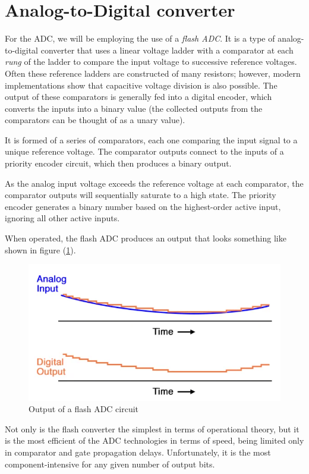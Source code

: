 \documentclass[%
 reprint,
nofootinbib,
 amsmath,amssymb,
 aps,
floatfix,
]{revtex4-2}
\begin{document}
\section{Analog-to-Digital converter}
    For the ADC, we will be employing the use of a \textit{flash ADC}. It is a type of analog-to-digital converter that uses a linear voltage ladder with a comparator at each \textit{rung} of the ladder to compare the input voltage to successive reference voltages. Often these reference ladders are constructed of many resistors; however, modern implementations show that capacitive voltage division is also possible. The output of these comparators is generally fed into a digital encoder, which converts the inputs into a binary value (the collected outputs from the comparators can be thought of as a unary value).
    \par
    It is formed of a series of comparators, each one comparing the input signal to a unique reference voltage. The comparator outputs connect to the inputs of a priority encoder circuit, which then produces a binary output.
    \par
    As the analog input voltage exceeds the reference voltage at each comparator, the comparator outputs will sequentially saturate to a high state. The priority encoder generates a binary number based on the highest-order active input, ignoring all other active inputs.
    \par
    When operated, the flash ADC produces an output that looks something like shown in figure (\ref{fig:flashadc}).
    \begin{figure}
        \centering
        \includegraphics[scale = 0.55]{Figures/flashadc.png}
        \caption{Output of a flash ADC circuit}
        \label{fig:flashadc}
    \end{figure}
    Not only is the flash converter the simplest in terms of operational theory, but it is the most efficient of the ADC technologies in terms of speed, being limited only in comparator and gate propagation delays. Unfortunately, it is the most component-intensive for any given number of output bits.
\end{document}
